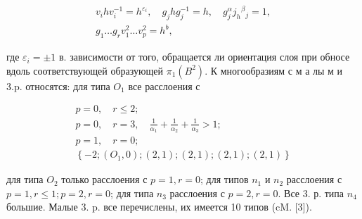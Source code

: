 \documentclass[10pt]{article}
\begin{document}
\[

\begin{gathered}

v_{i} h v_{i}^{-1}=h^{\varepsilon_{i}}, \quad g_{j} h g_{j}^{-1}=h, \quad g_{j}^{\alpha} j_{h}{ }^{\beta}{ }_{j}=1, \\

g_{1} \ldots g_{r} v_{1}^{2} \ldots v_{p}^{2}=h^{b},

\end{gathered}

\]



где $\varepsilon_{i}= \pm 1$ в. зависимости от того, обращается ли ориентация слоя при обносе вдоль соответствующей образующей $\pi_{1}\left(B^{2}\right)$. $К$ многообразиям с м а лы м и 3.p. относятся: для типа $O_{1}$ все расслоения с



\[

\begin{gathered}

p=0, \quad r \leqslant 2 ; \\

p=0, \quad r=3, \quad \frac{1}{\alpha_{1}}+\frac{1}{\alpha_{2}}+\frac{1}{\alpha_{3}}>1 ; \\

p=1, \quad r=0 ; \\

\left\{-2 ;\left(O_{1}, 0\right) ;(2,1) ;(2,1) ;(2,1) ;(2,1)\right\}

\end{gathered}

\]



для типа $O_{2}$ только расслоения с $p=1, r=0$; для типов $n_{1}$ и $n_{2}$ расслоения с $p=1, r \leqslant 1 ; p=2, r=0$; для типа $n_{3}$ расслоения с $p=2, r=0$. Все 3. р. типа $n_{4}$ большие. Малые 3. p. все перечислены, их имеется 10 типов (cM. [3]).
\end{document}
